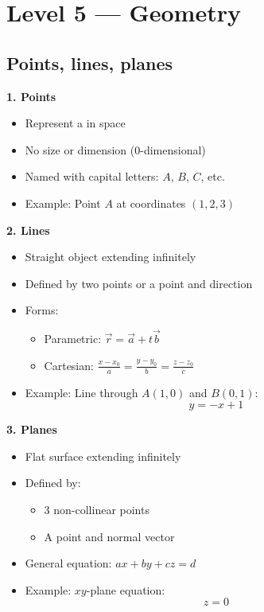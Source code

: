 \documentclass{article} %
\begin{document}
\section{Level 5 — Geometry}
\subsection{Points, lines, planes}

\textbf{1. Points}
\begin{itemize}
    \item Represent a  in space
    \item No size or dimension (0-dimensional)
    \item Named with capital letters: $A$, $B$, $C$, etc.
    \item Example: Point $A$ at coordinates $(1, 2, 3)$
\end{itemize}

\textbf{2. Lines}
\begin{itemize}
    \item Straight  object extending infinitely
    \item Defined by two points or a point and direction
    \item Forms:
    \begin{itemize}
        \item Parametric: $\vec{r} = \vec{a} + t\vec{b}$
        \item Cartesian: $\frac{x-x_0}{a} = \frac{y-y_0}{b} = \frac{z-z_0}{c}$
    \end{itemize}
    \item Example: Line through $A(1,0)$ and $B(0,1)$:
    \[ y = -x + 1 \]
\end{itemize}

\textbf{3. Planes}
\begin{itemize}
    \item Flat  surface extending infinitely
    \item Defined by:
    \begin{itemize}
        \item 3 non-collinear points
        \item A point and normal vector
    \end{itemize}
    \item General equation: $ax + by + cz = d$
    \item Example: $xy$-plane equation:
    \[ z = 0 \]
\end{itemize}
\end{document}
